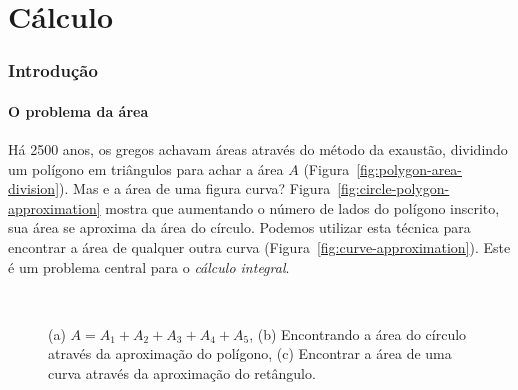 \clearpage\part{Cálculo}
\section{Introdução}

\subsection{O problema da área}
Há 2500 anos, os gregos achavam áreas através do método da exaustão, dividindo um polígono em triângulos para achar a área $A$ (Figura~\ref{fig:polygon-area-division}). Mas e a área de uma figura curva?  Figura~\ref{fig:circle-polygon-approximation} mostra que aumentando o número de lados do polígono inscrito, sua área se aproxima da área do círculo. Podemos utilizar esta técnica para encontrar a área de qualquer outra curva (Figura~\ref{fig:curve-approximation}). Este é um problema central para o \emph{cálculo integral}.
\vspace{-0.6cm}
\begin{figure}[!ht]
  \vspace{-0.3cm}
  \\
  
  \caption{(a) $A = A_1+A_2+A_3+A_4+A_5$, (b) Encontrando a área do círculo através da aproximação do polígono, (c) Encontrar a área de uma curva através da aproximação do retângulo.}
\end{figure}

